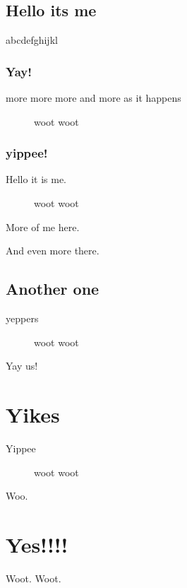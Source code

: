 \documentclass{report}
\author{Hello its me}
\begin{document}
\section{Hello its me}
abcdefghijkl
\subsection{Yay!}
more more more and more as it happens
\begin{figure}
    \caption{woot woot}
\end{figure}
\subsection{yippee!}
Hello it is me.
\begin{figure}
    \caption{woot woot}
\end{figure}
More of me here.

And even more there.
\section{Another one}
yeppers
\begin{figure}
    \caption{woot woot}
\end{figure}
Yay us!
\chapter{Yikes}
Yippee
\begin{figure}
    \caption{woot woot}
\end{figure}
Woo.
\chapter{Yes!!!!}
Woot. Woot.
\end{document}
